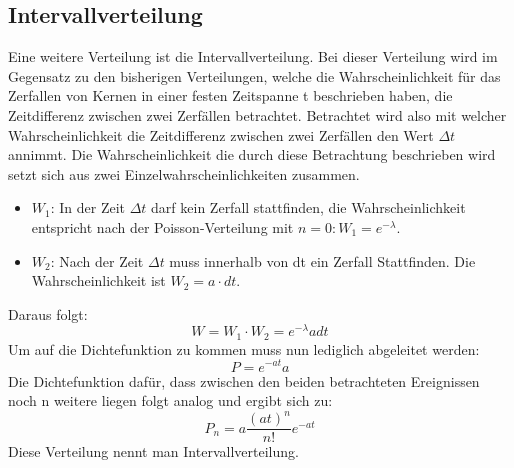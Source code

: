 \documentclass{article}
\begin{document}
            \subsection{Intervallverteilung}
                Eine weitere Verteilung ist die Intervallverteilung. Bei dieser Verteilung wird im Gegensatz zu den bisherigen Verteilungen, welche die
                Wahrscheinlichkeit für das Zerfallen von Kernen in einer festen Zeitspanne t beschrieben haben, die Zeitdifferenz zwischen
                zwei Zerfällen betrachtet. Betrachtet wird also mit welcher Wahrscheinlichkeit die Zeitdifferenz zwischen zwei Zerfällen
                den Wert $\Delta t$ annimmt. Die Wahrscheinlichkeit die durch diese Betrachtung beschrieben wird setzt sich aus zwei Einzelwahrscheinlichkeiten
                zusammen.
                \begin{itemize}
                    \item $W_1$: In der Zeit $\Delta t$ darf kein Zerfall stattfinden, die Wahrscheinlichkeit entspricht nach der Poisson-Verteilung
                    mit $n = 0 : W_1 = e^{-\lambda}$.
                    \item $W_2$: Nach der Zeit $\Delta t$ muss innerhalb von dt ein Zerfall Stattfinden. Die Wahrscheinlichkeit ist $W_2 = a\cdot dt$.
                \end{itemize}
                Daraus folgt:
                $$ W = W_1 \cdot W_2 = e^{-\lambda} a dt$$
                Um auf die Dichtefunktion zu kommen muss nun lediglich abgeleitet werden:
                $$P = e^{-at}a$$
                Die Dichtefunktion dafür, dass zwischen den beiden betrachteten Ereignissen noch n weitere liegen folgt analog und ergibt sich zu:
                $$P_n = a \frac{(at)^n}{n!}e^{-at}$$
                Diese Verteilung nennt man Intervallverteilung.
\end{document}
